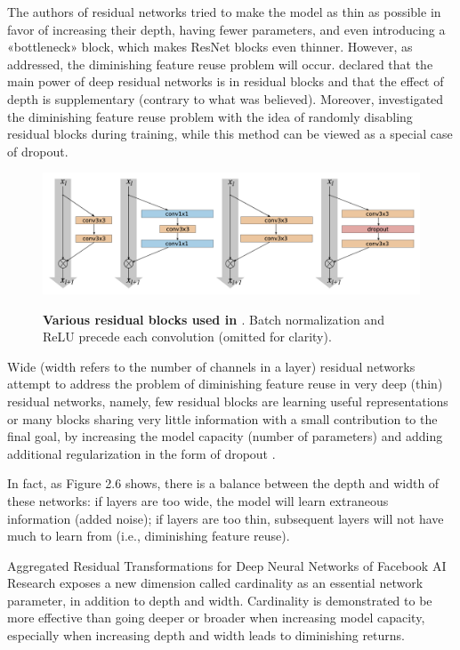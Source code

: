 The authors of residual networks\cite{20} tried to make the model as thin as possible in favor of increasing their depth, having fewer parameters, and even introducing a «bottleneck» block, which makes ResNet blocks even thinner. However, as \cite{wideres}  addressed, the diminishing feature reuse problem will occur. \cite{wideres} declared that the main power of deep residual networks is in residual blocks and that the effect of depth is supplementary (contrary to what was believed). Moreover, \cite{stochasticres} investigated the diminishing feature reuse problem with the idea of randomly disabling residual blocks during training, while this method can be viewed as a special case of dropout\cite{dropout}.

\begin{figure}[t]
\begin{center}
\centering
\includegraphics[width=\textwidth]{thesis-template-master/images/wide.png}
\label{fig:cellnet}
\end{center}
\caption{\textbf{Various residual blocks used in \cite{wideres}}. Batch normalization and ReLU precede
each convolution (omitted for clarity).}
\end{figure}

Wide (width refers to the number of channels in a layer) residual networks \cite{wideres} attempt to address the problem of diminishing feature reuse in very deep (thin) residual networks, namely, few residual blocks are learning useful representations or many blocks sharing very little information with a small contribution to the final goal, by increasing the model capacity (number of parameters) and adding additional regularization in the form of dropout \cite{dropout}.

In fact, as Figure 2.6 shows, there is a balance between the depth and width of these networks: if layers are too wide, the model will learn extraneous information (added noise); if layers are too thin,  subsequent layers will not have much to learn from (i.e., diminishing feature reuse).

Aggregated Residual Transformations for Deep Neural Networks \cite{aggres} of Facebook AI Research exposes a new dimension called cardinality as an essential network parameter, in addition to depth and width. Cardinality is demonstrated to be more effective than going deeper or broader when increasing model capacity, especially when increasing depth and width leads to diminishing returns\cite{aggres}.




